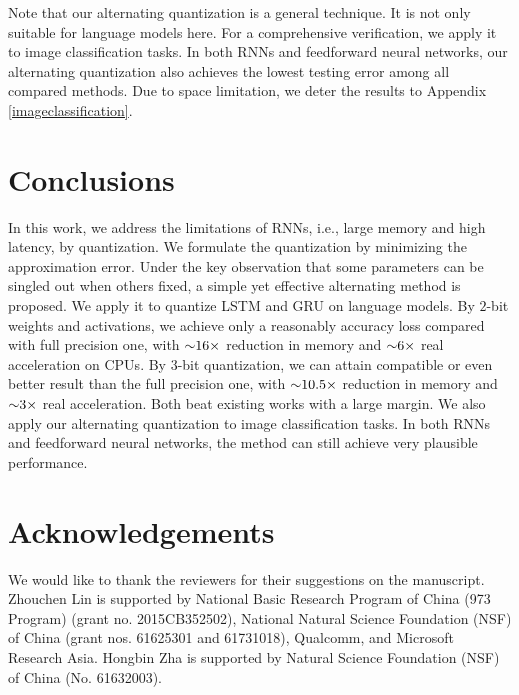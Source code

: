 \documentclass{article} %
\newcommand{\<}{\left\langle}
\renewcommand{\>}{\right\rangle}
\begin{document}
Note that our alternating quantization is a general technique. It is not only suitable for language models here. For a comprehensive verification, we apply it to image classification tasks. In both RNNs and feedforward neural networks, our alternating quantization also achieves the lowest testing error among all compared methods. Due to space limitation, we deter the results to Appendix \ref{imageclassification}.    




\section{Conclusions}
In this work, we address the limitations of RNNs, i.e., large memory and high latency, by quantization.  We formulate the quantization by minimizing the approximation error. Under the key observation that some parameters can be singled out when others fixed, a simple yet effective alternating method is proposed.  We apply it to quantize LSTM and GRU on language models. By $2$-bit weights and activations, we achieve only a reasonably accuracy loss compared with full precision one, with $\scriptsize{\sim}16\times$ reduction in memory and $\scriptsize{\sim}6 \times$ real acceleration on CPUs.  By $3$-bit quantization, we can attain compatible or even better result than the full precision one, with $\scriptsize{\sim}10.5\times$ reduction in memory and $\scriptsize{\sim}3 \times $ real acceleration. Both beat existing works with a large margin.  We also apply our alternating quantization to image classification tasks. In both RNNs and feedforward neural networks, the method can still achieve very plausible performance. 
\section{Acknowledgements}
We would like to thank the reviewers for their suggestions on the manuscript. Zhouchen Lin is supported by National Basic Research Program of China (973 Program) (grant no. 2015CB352502), National Natural Science Foundation (NSF) of China (grant nos. 61625301 and 61731018), Qualcomm, and Microsoft Research Asia.  Hongbin Zha is supported by Natural Science Foundation (NSF)  of China (No. 61632003).




\newpage

\appendix
\end{document}
